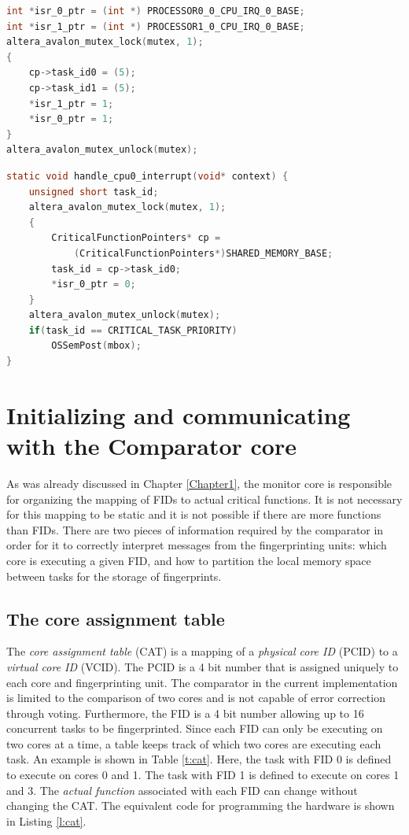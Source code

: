 \begin{lstlisting}[frame=single,language=C,label=l:mon_irq_send,caption={[Monitor message passing to plain cores]The monitor core puts a message in the shared memory region and then writes to the ISR pointer variables\, triggering interrupts in the other cores.}]
int *isr_0_ptr = (int *) PROCESSOR0_0_CPU_IRQ_0_BASE;
int *isr_1_ptr = (int *) PROCESSOR1_0_CPU_IRQ_0_BASE;	
altera_avalon_mutex_lock(mutex, 1);
{
	cp->task_id0 = (5);
	cp->task_id1 = (5);
	*isr_1_ptr = 1;
	*isr_0_ptr = 1;
}
altera_avalon_mutex_unlock(mutex);
\end{lstlisting}

\begin{lstlisting}[frame=single,language=C,label=l:cpu_irq,caption={[Plain cores retrieve arguments from shared memory]The plain cores handle the interrupt and retrieve the necessary information.}]
static void handle_cpu0_interrupt(void* context) {
	unsigned short task_id;
	altera_avalon_mutex_lock(mutex, 1);
	{
		CriticalFunctionPointers* cp = 
		    (CriticalFunctionPointers*)SHARED_MEMORY_BASE;
		task_id = cp->task_id0;
		*isr_0_ptr = 0;
	}
	altera_avalon_mutex_unlock(mutex);
	if(task_id == CRITICAL_TASK_PRIORITY)
		OSSemPost(mbox);
}
\end{lstlisting}

\section{Initializing and communicating with the Comparator core}

As was already discussed in Chapter \ref{Chapter1}, the monitor core is responsible for organizing the mapping of FIDs to actual critical functions. It is not necessary for this mapping to be static and it is not possible if there are more functions than FIDs. There are two pieces of information required by the comparator in order for it to correctly interpret messages from the fingerprinting units: which core is executing a given FID, and how to partition the local memory space between tasks for the storage of fingerprints.

\subsection{The core assignment table}

The \emph{core assignment table} (CAT) is a mapping of a \emph{physical core ID} (PCID) to a \emph{virtual core ID} (VCID). The PCID is a 4 bit number that is assigned uniquely to each core and fingerprinting unit. The comparator in the current implementation is limited to the comparison of two cores and is not capable of error correction through voting. Furthermore, the FID is a 4 bit number allowing up to 16 concurrent tasks to be fingerprinted. Since each FID can only be executing on two cores at a time, a table keeps track of which two cores are executing each task. An example is shown in Table \ref{t:cat}. Here, the task with FID 0 is defined to execute on cores 0 and 1. The task with FID 1 is defined to execute on cores 1 and 3. The \emph{actual function} associated with each FID can change without changing the CAT. The equivalent code for programming the hardware is shown in Listing \ref{l:cat}.


